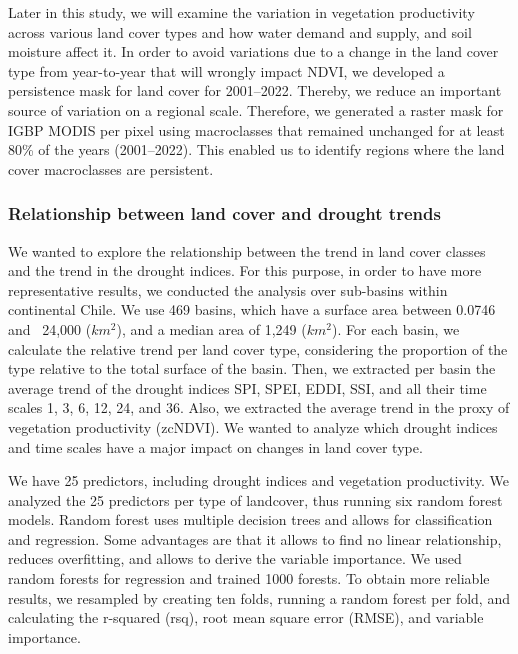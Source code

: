 \documentclass[
  authoryear,
  preprint,
  3p,
  onecolumn]{elsarticle}
\begin{document}
Later in this study, we will examine the variation in vegetation
productivity across various land cover types and how water demand and
supply, and soil moisture affect it. In order to avoid variations due to
a change in the land cover type from year-to-year that will wrongly
impact NDVI, we developed a persistence mask for land cover for
2001--2022. Thereby, we reduce an important source of variation on a
regional scale. Therefore, we generated a raster mask for IGBP MODIS per
pixel using macroclasses that remained unchanged for at least 80\% of
the years (2001--2022). This enabled us to identify regions where the
land cover macroclasses are persistent.

\hypertarget{relationship-between-land-cover-and-drought-trends}{%
\subsubsection{Relationship between land cover and drought
trends}\label{relationship-between-land-cover-and-drought-trends}}

We wanted to explore the relationship between the trend in land cover
classes and the trend in the drought indices. For this purpose, in order
to have more representative results, we conducted the analysis over
sub-basins within continental Chile. We use 469 basins, which have a
surface area between 0.0746 and ~24,000 (\(km^2\)), and a median area of
1,249 (\(km^2\)). For each basin, we calculate the relative trend per
land cover type, considering the proportion of the type relative to the
total surface of the basin. Then, we extracted per basin the average
trend of the drought indices SPI, SPEI, EDDI, SSI, and all their time
scales 1, 3, 6, 12, 24, and 36. Also, we extracted the average trend in
the proxy of vegetation productivity (zcNDVI). We wanted to analyze
which drought indices and time scales have a major impact on changes in
land cover type.

We have 25 predictors, including drought indices and vegetation
productivity. We analyzed the 25 predictors per type of landcover, thus
running six random forest models. Random forest uses multiple decision
trees and allows for classification and regression. Some advantages are
that it allows to find no linear relationship, reduces overfitting, and
allows to derive the variable importance. We used random forests for
regression and trained 1000 forests. To obtain more reliable results, we
resampled by creating ten folds, running a random forest per fold, and
calculating the r-squared (rsq), root mean square error (RMSE), and
variable importance.
\end{document}
